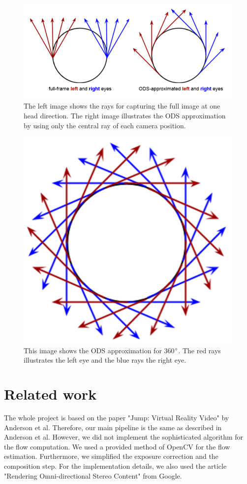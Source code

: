 \documentclass[10pt,twocolumn,letterpaper]{article}
\begin{document}
\begin{figure}[t]
\begin{center}
	\includegraphics[width=0.8\linewidth]{pictures/approxi.png}
\end{center}
   \caption{The left image shows the rays for capturing the full image at one head direction. The right image illustrates the ODS approximation by using only the central ray of each camera position.}
\label{fig:long}
\label{fig:onecol}
\end{figure}

\begin{figure}[t]
\begin{center}
   \includegraphics[width=0.5\linewidth]{pictures/ods.png}
\end{center}
   \caption{This image shows the ODS approximation for 360$\degree$. The red rays illustrates the left eye and the blue rays the right eye.}
\label{fig:long}
\label{fig:onecol}
\end{figure}


\section{Related work}
The whole project is based on the paper "Jump: Virtual Reality Video" by Anderson et al. Therefore, our main pipeline is the same as described in Anderson et al. However, we did not implement the sophisticated algorithm for the flow computation. We used a provided method of OpenCV for the flow estimation. Furthermore, we simplified the exposure correction and the composition step. For the implementation details, we also used the article "Rendering Omni-directional Stereo Content" from Google.
\end{document}
